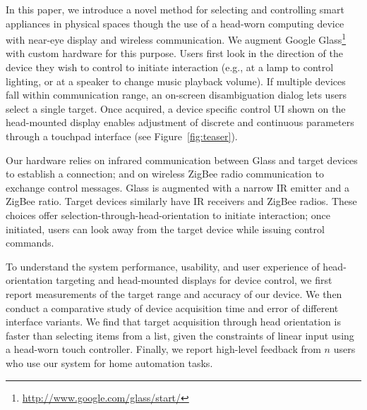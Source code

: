 In this paper, we introduce a novel method for selecting and controlling smart appliances in physical spaces though the use of a head-worn computing device with near-eye display and wireless communication. We augment Google Glass\footnote{\url{http://www.google.com/glass/start/}} with custom hardware for this purpose. Users first look in the direction of the device they wish to control to initiate interaction (e.g., at a lamp to control lighting, or at a speaker to change music playback volume). If multiple devices fall within communication range, an on-screen disambiguation dialog lets users select a single target. Once acquired, a device specific control UI shown on the head-mounted display enables adjustment of discrete and continuous parameters through a touchpad interface (see Figure~\ref{fig:teaser}).

Our hardware relies on infrared communication between Glass and target devices to establish a connection; and on wireless ZigBee radio communication to exchange control messages.  Glass is augmented with a narrow IR emitter and a ZigBee ratio. Target devices similarly have IR receivers and ZigBee radios. These choices offer selection-through-head-orientation to initiate interaction; once initiated, users can look away from the target device while issuing control commands.

To understand the system performance, usability, and user experience of head-orientation targeting and head-mounted displays for device control, we first report measurements of the target range and accuracy of our device. We then conduct a comparative study of device acquisition time and error of different interface variants. We find that target acquisition through head orientation is faster than selecting items from a list, given the constraints of linear input using a head-worn touch controller. Finally, we report high-level feedback from $n$ users who use our system for home automation tasks.



